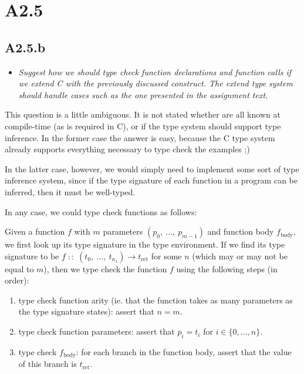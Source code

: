 \newpage

\section{A2.5}


\subsection{A2.5.b }

\begin{itemize}
  \item \emph{Suggest how we should type check function declarations and
    function calls if we extend C with the previously discussed construct. The
    extend type system should handle cases such as the one presented in the
    assignment text.}
\end{itemize}

This question is a little ambiguous. It is not stated whether 
are all known at compile-time (as is required in C), or if the type system
should support type inference. In the former case the answer is easy, because
the C type system already supports everything necessary to type check the
examples ;)

\smallskip

In the latter case, however, we would simply need to implement some sort of type
inference system, since if the type signature of each function in a program can
be inferred, then it must be well-typed.

\bigskip

In any case, we could type check functions as follows:

\smallskip

Given a function $f$ with $m$ parameters $(p_0,\ \dots,\ p_{m - 1})$ and function body
$f_{\text{body}}$, we first look up its type signature in the type environment.
If we find its type signature to be $f\; ::\; (t_0,\ ...,\ t_{n_1}) \to
t_{\text{ret}}$ for some $n$ (which may or may not be equal to $m$), then we type check
the function $f$ using the following steps (in order):

\begin{enumerate}
  \item type check function arity (ie. that the function takes as many
  parameters as the type signature states): assert that $n = m$.

  \item type check function parameters: assert that $p_i = t_i$ for $i \in \{0,
    \dots, n\}$.

  \item type check $f_\text{body}$: for each branch in the function body, assert
    that the value of this branch is $t_\text{ret}$.
\end{enumerate}

